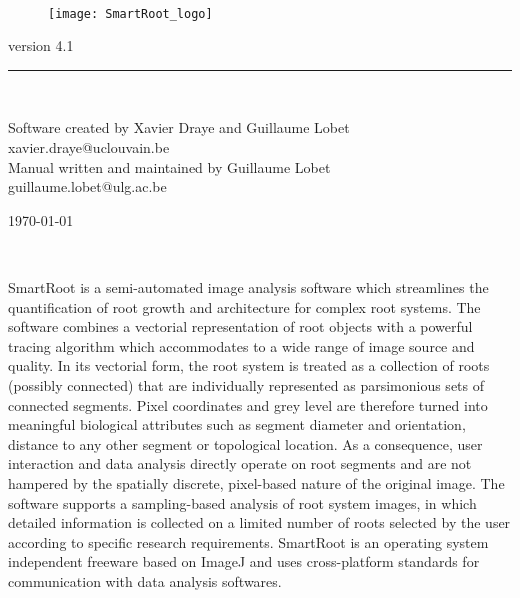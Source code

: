 \documentclass[a4paper,english,10pt]{report}
\begin{document}

\thispagestyle{empty}
~
\vspace {75mm}

\begin{flushright}

\begin{figure}[!h]
\hspace{10mm} \texttt{[image: SmartRoot\_logo]}
\end{figure}

{\Large version 4.1}
\hspace{5mm}\\
\vspace{10mm}
{\color{coolSection}\rule{145mm}{3mm}}\\

\end{flushright}


\vspace{5mm}


\begin{flushright}
\vspace{5mm}
{\large Software created by Xavier Draye and Guillaume Lobet}\\ 
xavier.draye@uclouvain.be\\
\vspace{5mm}
{\large Manual written and maintained by Guillaume Lobet}\\ 
guillaume.lobet@ulg.ac.be\\
\end{flushright}

\vspace{10mm}

\begin{center}
\vfill
{\large \today} 
\end{center}

~~
\newpage
~~
\vspace{13cm}

SmartRoot is a semi-automated image analysis software which streamlines the quantification of root growth and architecture for complex root systems. The software combines a vectorial representation of root objects with a powerful tracing algorithm which accommodates to a wide range of image source and quality. In its vectorial form, the root system is treated as a collection of roots (possibly connected) that are individually represented as parsimonious sets of connected segments. Pixel coordinates and grey level are therefore turned into meaningful biological attributes such as segment diameter and orientation, distance to any other segment or topological location. As a consequence, user interaction and data analysis directly operate on root segments and are not hampered by the spatially discrete, pixel-based nature of the original image. The software supports a sampling-based analysis of root system images, in which detailed information is collected on a limited number of roots selected by the user according to specific research requirements. SmartRoot is an operating system independent freeware based on ImageJ and uses cross-platform standards for communication with data analysis softwares.\\
\end{document}
